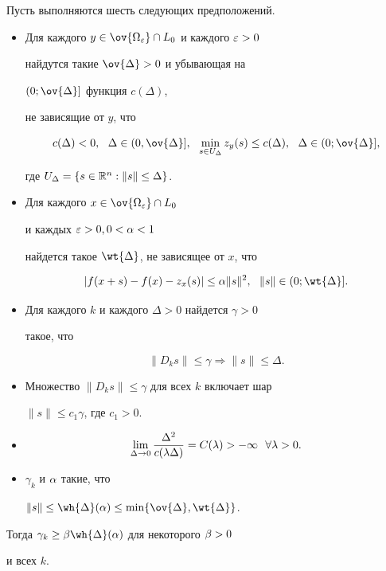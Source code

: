 \begin{thms}


Пусть выполняются шесть следующих предположений.


\begin{itemize}


\item[1)] Для каждого $y \in \ov{\Omega_{\e}} \cap L_0$ и каждого $\varepsilon>0$


найдутся такие $\ov{\Delta}>0$ и убывающая на


$(0; \ov{\Delta}]$ функция $c(\Delta)$,


не зависящие от $y$, что


$$


c(\Delta) <0, \ \ \Delta \in (0,\ov{\Delta}],


\ \ \min_{s \in U_{\Delta}} z_y (s) \leq c(\Delta),


\ \ \Delta \in (0;\ov{\Delta}],


$$


где $U_{\Delta} = \{ s \in \Bbb R^n: \|s\| \leq \Delta \}$.


\item[2)] Для каждого $x \in \ov{\Omega_{\e}} \cap L_0$


и каждых $\varepsilon>0, 0<\alpha<1$


найдется такое $\wt{\Delta}$, не зависящее от $x$, что


$$


|f(x+s) - f(x) - z_x (s)| \leq \ga \|s\|^2,


\ \ \|s\| \in (0;\wt{\Delta}].


$$


\item[3)] Для каждого $k$ и каждого $\Delta>0$ найдется $\gamma>0$


такое, что


$$


\|D_k s\| \leq \gamma \Rightarrow \|s\| \leq \Delta.


$$


\item[4)] Множество $\|D_k s\| \leq \gamma$ для всех $k$ включает шар


$\|s\| \leq c_1 \gamma$, где $c_1>0$.


\item[5)]


$$


\lim_{\Delta \rar 0} \frac{\Delta^2}{c(\gl \Delta)} = C(\gl) >


-\infty \ \ \forall \gl>0.


$$


\item[6)] $\gamma_k$ и $\alpha$ такие, что


$\|s\| \leq \wh{\Delta} (\ga) \leq \min \{\ov{\Delta},\wt{\Delta}\}$.


\end{itemize}





\noindent{}Тогда $\gamma_k\geq\gb \wh{\Delta} (\ga)$ для некоторого $\beta>0$ 


и всех $k$.


\end{thms}

